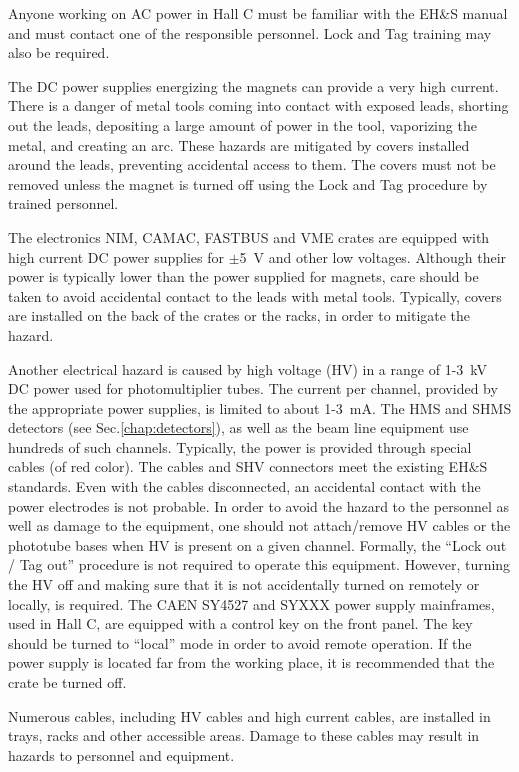 Anyone working on AC power in Hall C must be familiar with the EH\&S\cite{EHScebaf} manual 
 and must contact one of the responsible personnel. Lock and Tag training may also be required.

 The DC power supplies energizing the magnets can provide a very high current.
 There is a danger of metal tools coming into contact with exposed leads, shorting out the
 leads, depositing a large amount of power in the tool, vaporizing the metal, and creating an arc.
 These hazards are mitigated by covers installed around the leads,
 preventing accidental access to them. The covers must not be removed
 unless the magnet is turned off using the Lock and Tag procedure by trained
 personnel. 

 The electronics NIM, CAMAC, FASTBUS and VME crates are equipped with high current
 DC power supplies for $\pm$5~V and other low voltages. Although their power 
 is typically lower than the power supplied for magnets,
 care should be taken to avoid accidental contact to the leads with metal tools.
 Typically, covers are installed on the back of the crates or the racks,
 in order to mitigate the hazard. 

 Another electrical hazard is caused by high voltage (HV) in a range of 1-3~kV  DC power used 
 for photomultiplier tubes. The current per channel, provided by the appropriate power supplies,
 is limited to about 1-3~mA. 
 The HMS and SHMS detectors 
 (see Sec.\ref{chap:detectors}), as well as the beam line equipment use 
 hundreds of such channels. 
 Typically, the power is provided through special cables (of red color). The cables and SHV connectors 
 meet the existing EH\&S standards. Even with the cables disconnected, an accidental
 contact with the power electrodes is not probable. In order to avoid the hazard to the personnel
 as well as damage to the equipment, one should not attach/remove HV cables or the
 phototube bases when HV is present on a given channel. Formally, the ``Lock out / Tag out'' 
 procedure is not required to operate this equipment. However, turning the HV off
 and making sure that it is not accidentally turned on remotely or locally, is required.
The CAEN SY4527 and SYXXX power supply mainframes,
used in Hall C, are equipped with
 a control key on the front panel. The key should be turned to ``local'' mode in order to
 avoid remote operation. If the power supply is located far from the working place,
 it is recommended that the crate be turned off. %
 
 Numerous cables, including HV cables and high current cables, are installed in trays, 
 racks and other accessible areas. Damage to these cables may result
 in hazards to personnel and equipment. 

